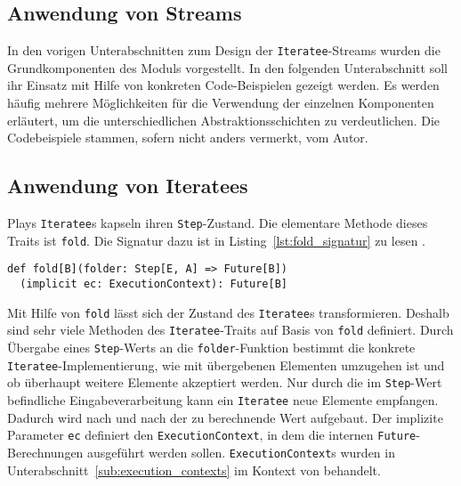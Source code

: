 


\subsection{Anwendung von Streams} %
\label{sub:anwendung}

In den vorigen Unterabschnitten zum Design der \lstinline|Iteratee|-Streams wurden die Grundkomponenten des Moduls vorgestellt.
In den folgenden Unterabschnitt soll ihr Einsatz mit Hilfe von konkreten Code-Beispielen gezeigt werden.
Es werden häufig mehrere Möglichkeiten für die Verwendung der einzelnen Komponenten erläutert, um die unterschiedlichen Abstraktionsschichten zu verdeutlichen.
Die Codebeispiele stammen, sofern nicht anders vermerkt, vom Autor.



\subsection{Anwendung von Iteratees} %
\label{sub:iteratees}

Plays \lstinline|Iteratee|s kapseln ihren \lstinline|Step|-Zustand.
Die elementare Methode dieses Traits ist \lstinline|fold|.
Die Signatur dazu ist in Listing~\ref{lst:fold_signatur} zu lesen \cite[vgl.][Z.~400]{play_iteratee_source_code}.
\begin{lstlisting}[caption=Die Signatur von fold, label=lst:fold_signatur]
def fold[B](folder: Step[E, A] => Future[B])
  (implicit ec: ExecutionContext): Future[B]
\end{lstlisting}

Mit Hilfe von \lstinline|fold| lässt sich der Zustand des \lstinline|Iteratee|s transformieren.
Deshalb sind sehr viele Methoden des \lstinline|Iteratee|-Traits auf Basis von \lstinline|fold| definiert.
Durch Übergabe eines \lstinline|Step|-Werts an die \lstinline|folder|-Funktion bestimmt die konkrete \lstinline|Iteratee|-Implementierung, wie mit übergebenen Elementen umzugehen ist und ob überhaupt weitere Elemente akzeptiert werden.
Nur durch die im \lstinline|Step|-Wert befindliche Eingabeverarbeitung kann ein \lstinline|Iteratee| neue Elemente empfangen.
Dadurch wird nach und nach der zu berechnende Wert aufgebaut.
Der implizite Parameter \lstinline|ec| definiert den \lstinline|ExecutionContext|, in dem die internen \lstinline|Future|-Berechnungen ausgeführt werden sollen.
\lstinline|ExecutionContext|s wurden in Unterabschnitt~\ref{sub:execution_contexts} im Kontext von  behandelt.

